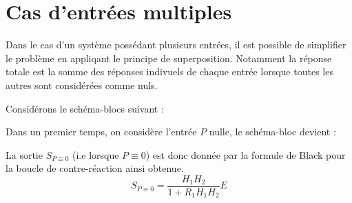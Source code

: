 \newpage
\section{Cas d'entrées multiples}

Dans le cas d'un système possédant plusieurs entrées, il est possible de simplifier 
le problème en appliqant le principe de superposition. Notamment la réponse totale est la somme
des réponses indivuels de chaque entrée lorsque toutes les autres sont considérées comme nuls.

Considérons le schéma-blocs suivant :
\begin{center}                                                                                                                
\end{center}                                                                                                                  

Dans un premier temps, on considère l'entrée $P$ nulle, le schéma-bloc devient :
\begin{center}                                                                                                                
\end{center}                                                                                                                  
La sortie $S_{P\equiv 0}$ (i.e lorsque $P\equiv0$) est donc donnée 
par la formule de Black pour la boucle de contre-réaction ainsi obtenue.
$$
S_{P\equiv 0}=\dfrac{H_1H_2}{1+R_1H_1H_2} E
$$

